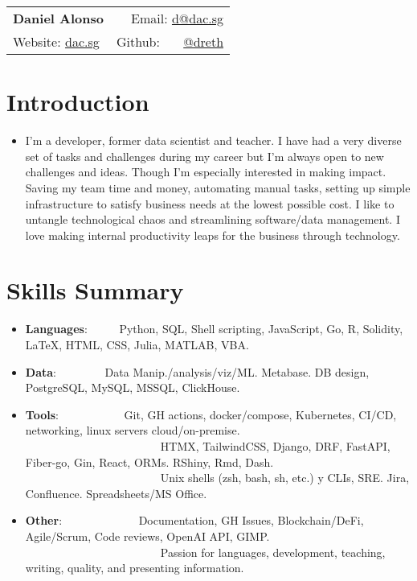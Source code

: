 \documentclass[a4paper,20pt]{article}
\newcommand{\resumeItem}[2]{
  \item\small{
    \textbf{#1}{: #2 \vspace{-2pt}}
  }
}
\newcommand{\resumeSubItem}[2]{\resumeItem{#1}{#2}\vspace{-3pt}}
\newcommand{\resumeSubHeadingListStart}{\begin{itemize}[leftmargin=*]}
\newcommand{\resumeSubHeadingListEnd}{\end{itemize}}
\begin{document}
\begin{tabular*}{\textwidth}{l@{\extracolsep{\fill}}r}
  \textbf{{\LARGE Daniel Alonso}} & Email: {\color{blue}\href{mailto:}{d@dac.sg}}\\
  Website: {\color{blue}\href{https://dac.sg}{dac.sg}} & Github: ~~~{\color{blue}\href{https://github.com/dreth}{@dreth}}
\end{tabular*}




            
\vspace{-3pt}
\section{Introduction}
{\begin{itemize} \itemsep-0.24em
\item {I'm a developer, former data scientist and teacher. I have had a very diverse set of tasks and challenges during my career but I'm always open to new challenges and ideas. Though I'm especially interested in making impact. Saving my team time and money, automating manual tasks, setting up simple infrastructure to satisfy business needs at the lowest possible cost. I like to untangle technological chaos and streamlining software/data management. I love making internal productivity leaps for the business through technology.}
\end{itemize}}
        


            
\vspace{-3pt}
\section{Skills Summary}
  \resumeSubHeadingListStart
            
        
\vspace{-1pt}
\resumeSubItem{Languages}{~~~~~Python, SQL, Shell scripting, JavaScript, Go, R, Solidity, LaTeX, HTML, CSS, Julia, MATLAB, VBA.}
\vspace{-1pt}
\resumeSubItem{Data}{~~~~~~~~Data Manip./analysis/viz/ML. Metabase. DB design, PostgreSQL, MySQL, MSSQL, ClickHouse.}
\vspace{-1pt}
\resumeSubItem{Tools}{~~~~~~~~~~~Git, GH actions, docker/compose, Kubernetes, CI/CD, networking, linux servers cloud/on-premise.\\~~~~~~~~~~~~~~~~~~~~~~~~HTMX, TailwindCSS, Django, DRF, FastAPI, Fiber-go, Gin, React, ORMs. RShiny, Rmd, Dash.\\~~~~~~~~~~~~~~~~~~~~~~~~Unix shells (zsh, bash, sh, etc.) y CLIs, SRE. Jira, Confluence. Spreadsheets/MS Office.}
\vspace{-1pt}
\resumeSubItem{Other}{~~~~~~~~~~~~~Documentation, GH Issues, Blockchain/DeFi, Agile/Scrum, Code reviews, OpenAI API, GIMP.\\~~~~~~~~~~~~~~~~~~~~~~~~Passion for languages, development, teaching, writing, quality, and presenting information.}
\resumeSubHeadingListEnd
\end{document}

